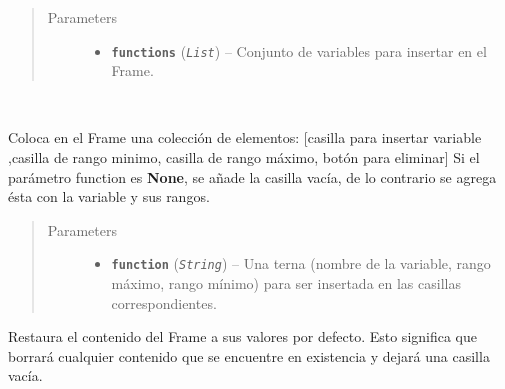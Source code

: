 \documentclass[class=report, crop=false]{standalone}
\begin{document}
\begin{fulllineitems}
\begin{fulllineitems}
\begin{quote}\begin{description}
\item[{Parameters}] \leavevmode\begin{itemize}
\item \textbf{\texttt{functions}} (\emph{\texttt{List}}) -- Conjunto de variables para insertar en el Frame.
\end{itemize}
\end{description}\end{quote}

\end{fulllineitems}

\begin{fulllineitems}

~
\vspace{-0.3cm}

Coloca en el Frame una colección de elementos:\break
{[}casilla para insertar variable ,casilla de rango minimo, casilla de rango máximo, botón para eliminar{]}\break
Si el parámetro function es \textbf{None}, se añade 
la casilla vacía, de lo contrario se agrega ésta con 
la variable y sus rangos.

\begin{quote}\begin{description}
\item[{Parameters}] \leavevmode\begin{itemize}
\item \textbf{\texttt{function}} (\emph{\texttt{String}}) -- Una terna (nombre de la variable, rango máximo, rango mínimo) para ser insertada en las casillas correspondientes.
\end{itemize}
\end{description}\end{quote}

\end{fulllineitems}

\begin{fulllineitems}

Restaura el contenido del Frame a sus valores por defecto.\break
Esto significa que borrará cualquier contenido que se 
encuentre en existencia y dejará una casilla vacía.

\end{fulllineitems}

\end{fulllineitems}
\end{document}
